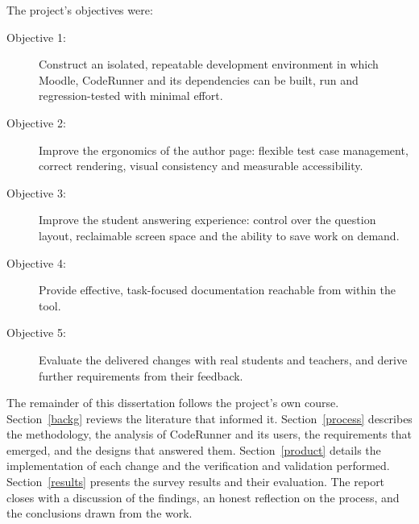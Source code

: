 The project's objectives were:

\begin{description}
\item [Objective 1:] Construct an isolated, repeatable development environment in which Moodle, CodeRunner and its dependencies can be built, run and regression-tested with minimal effort.
\item [Objective 2:] Improve the ergonomics of the author page: flexible test case management, correct rendering, visual consistency and measurable accessibility.
\item [Objective 3:] Improve the student answering experience: control over the question layout, reclaimable screen space and the ability to save work on demand.
\item [Objective 4:] Provide effective, task-focused documentation reachable from within the tool.
\item [Objective 5:] Evaluate the delivered changes with real students and teachers, and derive further requirements from their feedback.
\end{description}

The remainder of this dissertation follows the project's own course. Section~\ref{backg} reviews the literature that informed it. Section~\ref{process} describes the methodology, the analysis of CodeRunner and its users, the requirements that emerged, and the designs that answered them. Section~\ref{product} details the implementation of each change and the verification and validation performed. Section~\ref{results} presents the survey results and their evaluation. The report closes with a discussion of the findings, an honest reflection on the process, and the conclusions drawn from the work.
